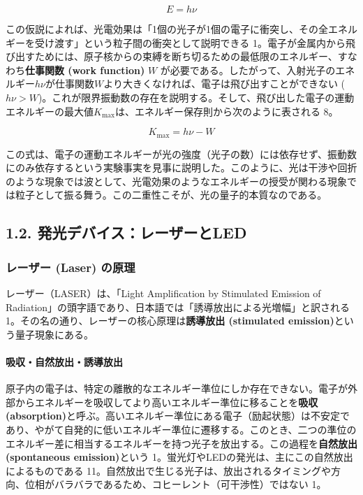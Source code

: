 \documentclass[11pt,a4paper]{ltjsarticle}
\begin{document}
\begin{equation}
E = h\nu
\end{equation}

この仮説によれば、光電効果は「1個の光子が1個の電子に衝突し、その全エネルギーを受け渡す」という粒子間の衝突として説明できる 1。電子が金属内から飛び出すためには、原子核からの束縛を断ち切るための最低限のエネルギー、すなわち\textbf{仕事関数 (work function)} $W$ が必要である。したがって、入射光子のエネルギー$h\nu$が仕事関数$W$より大きくなければ、電子は飛び出すことができない ($h\nu > W$)。これが限界振動数の存在を説明する。そして、飛び出した電子の運動エネルギーの最大値$K_{\mathrm{max}}$は、エネルギー保存則から次のように表される 8。

\begin{equation}
K_{\mathrm{max}} = h\nu - W
\end{equation}

この式は、電子の運動エネルギーが光の強度（光子の数）には依存せず、振動数にのみ依存するという実験事実を見事に説明した。このように、光は干渉や回折のような現象では波として、光電効果のようなエネルギーの授受が関わる現象では粒子として振る舞う。この二重性こそが、光の量子的本質なのである。

\subsection*{1.2. 発光デバイス：レーザーとLED}

\subsubsection*{レーザー (Laser) の原理}

レーザー（LASER）は、「Light Amplification by Stimulated Emission of Radiation」の頭字語であり、日本語では「誘導放出による光増幅」と訳される 1。その名の通り、レーザーの核心原理は\textbf{誘導放出 (stimulated emission)}という量子現象にある。

\paragraph{吸収・自然放出・誘導放出}

原子内の電子は、特定の離散的なエネルギー準位にしか存在できない。電子が外部からエネルギーを吸収してより高いエネルギー準位に移ることを\textbf{吸収 (absorption)}と呼ぶ。高いエネルギー準位にある電子（励起状態）は不安定であり、やがて自発的に低いエネルギー準位に遷移する。このとき、二つの準位のエネルギー差に相当するエネルギーを持つ光子を放出する。この過程を\textbf{自然放出 (spontaneous emission)}という 1。蛍光灯やLEDの発光は、主にこの自然放出によるものである 11。自然放出で生じる光子は、放出されるタイミングや方向、位相がバラバラであるため、コヒーレント（可干渉性）ではない 1。
\end{document}
